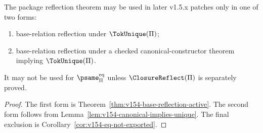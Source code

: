 \begin{corollary}
\label{cor:v154-stable-reflection-contract}
The package reflection theorem may be used in later v1.5.x patches only in one of two forms:
\begin{enumerate}
  \item base-relation reflection under \(\TokUnique(\Pi)\);
  \item base-relation reflection under a checked canonical-constructor theorem implying \(\TokUnique(\Pi)\).
\end{enumerate}
It may not be used for \(\psame_{\Pi}^{\mathrm{eq}}\) unless \(\ClosureReflect(\Pi)\) is separately proved.
\end{corollary}

\begin{proof}
The first form is Theorem~\ref{thm:v154-base-reflection-active}. The second form follows from Lemma~\ref{lem:v154-canonical-implies-unique}. The final exclusion is Corollary~\ref{cor:v154-eq-not-exported}.
\end{proof}
